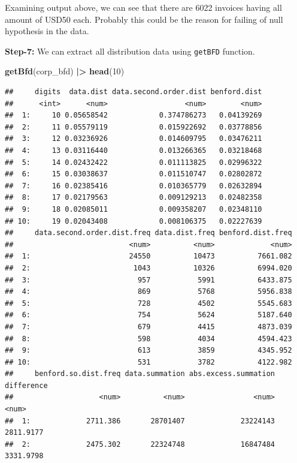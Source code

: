\documentclass[
]{book}
\newenvironment{Shaded}{\begin{snugshade}}{\end{snugshade}}
\newcommand{\DecValTok}[1]{\textcolor[rgb]{0.00,0.00,0.81}{#1}}
\newcommand{\FunctionTok}[1]{\textcolor[rgb]{0.13,0.29,0.53}{\textbf{#1}}}
\newcommand{\NormalTok}[1]{#1}
\newcommand{\SpecialCharTok}[1]{\textcolor[rgb]{0.81,0.36,0.00}{\textbf{#1}}}
\begin{document}
Examining output above, we can see that there are 6022 invoices having all amount of USD50 each. Probably this could be the reason for failing of null hypothesis in the data.

\textbf{Step-7:} We can extract all distribution data using \texttt{getBFD} function.

\begin{Shaded}
\begin{Highlighting}[]
\FunctionTok{getBfd}\NormalTok{(corp\_bfd) }\SpecialCharTok{|\textgreater{}} 
  \FunctionTok{head}\NormalTok{(}\DecValTok{10}\NormalTok{)}
\end{Highlighting}
\end{Shaded}

\begin{verbatim}
##     digits  data.dist data.second.order.dist benford.dist
##      <int>      <num>                  <num>        <num>
##  1:     10 0.05658542            0.374786273   0.04139269
##  2:     11 0.05579119            0.015922692   0.03778856
##  3:     12 0.03236926            0.014609795   0.03476211
##  4:     13 0.03116440            0.013266365   0.03218468
##  5:     14 0.02432422            0.011113825   0.02996322
##  6:     15 0.03038637            0.011510747   0.02802872
##  7:     16 0.02385416            0.010365779   0.02632894
##  8:     17 0.02179563            0.009129213   0.02482358
##  9:     18 0.02085011            0.009358207   0.02348110
## 10:     19 0.02043408            0.008106375   0.02227639
##     data.second.order.dist.freq data.dist.freq benford.dist.freq
##                           <num>          <num>             <num>
##  1:                       24550          10473          7661.082
##  2:                        1043          10326          6994.020
##  3:                         957           5991          6433.875
##  4:                         869           5768          5956.838
##  5:                         728           4502          5545.683
##  6:                         754           5624          5187.640
##  7:                         679           4415          4873.039
##  8:                         598           4034          4594.423
##  9:                         613           3859          4345.952
## 10:                         531           3782          4122.982
##     benford.so.dist.freq data.summation abs.excess.summation difference
##                    <num>          <num>                <num>      <num>
##  1:             2711.386       28701407             23224143  2811.9177
##  2:             2475.302       22324748             16847484  3331.9798

\end{verbatim}
\end{document}
